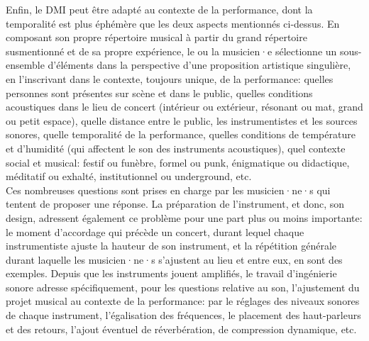 \noindent Enfin, le \gls{DMI} peut être adapté au contexte de la performance, dont la temporalité est plus éphémère que les deux aspects mentionnés ci-dessus. En composant son propre répertoire musical à partir du grand répertoire susmentionné et de sa propre expérience, le ou la musicien·e sélectionne un sous-ensemble d'éléments dans la perspective d'une proposition artistique singulière, en l'inscrivant dans le contexte, toujours unique, de la performance: quelles personnes sont présentes sur scène et dans le public, quelles conditions acoustiques dans le lieu de concert (intérieur ou extérieur, résonant ou mat, grand ou petit espace), quelle distance entre le public, les instrumentistes et les sources sonores, quelle temporalité de la performance, quelles conditions de température et d'humidité (qui affectent le son des instruments acoustiques), quel contexte social et musical: festif ou funèbre, formel ou punk, énigmatique ou didactique, méditatif ou exhalté, institutionnel ou underground, etc.\\
\indent Ces nombreuses questions sont prises en charge par les musicien·ne·s qui tentent de proposer une réponse. La préparation de l'instrument, et donc, son design, adressent également ce problème pour une part plus ou moins importante: le moment d'accordage qui précède un concert, durant lequel chaque instrumentiste ajuste la hauteur de son instrument, et la répétition générale durant laquelle les musicien·ne·s s'ajustent au lieu et entre eux, en sont des exemples. Depuis que les instruments jouent amplifiés, le travail d'ingénierie sonore adresse spécifiquement, pour les questions relative au son, l'ajustement du projet musical au contexte de la performance: par le réglages des niveaux sonores de chaque instrument, l'égalisation des fréquences, le placement des haut-parleurs et des retours, l'ajout éventuel de réverbération, de compression dynamique, etc.\\
